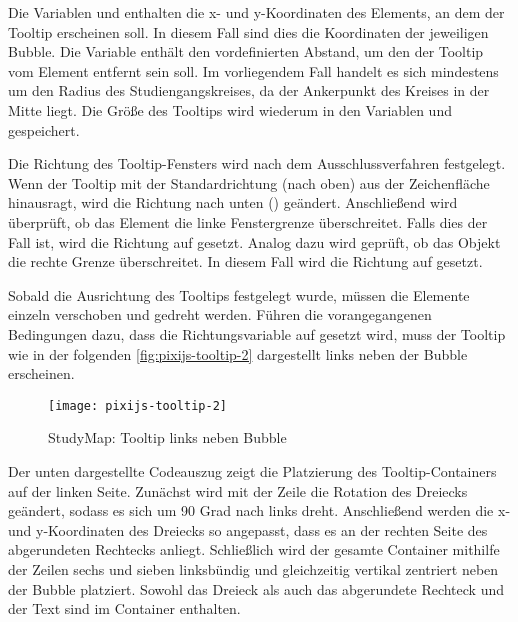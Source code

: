 Die Variablen  und  enthalten die x- und y-Koordinaten des Elements, an dem der Tooltip erscheinen soll. In diesem Fall sind dies die Koordinaten der jeweiligen Bubble. Die Variable  enthält den vordefinierten Abstand, um den der Tooltip vom Element entfernt sein soll. Im vorliegendem Fall handelt es sich mindestens um den Radius des Studiengangskreises, da der Ankerpunkt des Kreises in der Mitte liegt. Die Größe des Tooltips wird wiederum in den Variablen  und  gespeichert.

Die Richtung des Tooltip-Fensters wird nach dem Ausschlussverfahren festgelegt. Wenn der Tooltip mit der Standardrichtung  (nach oben) aus der Zeichenfläche hinausragt, wird die Richtung nach unten () geändert. Anschließend wird überprüft, ob das Element die linke Fenstergrenze überschreitet. Falls dies der Fall ist, wird die Richtung auf  gesetzt. Analog dazu wird geprüft, ob das Objekt die rechte Grenze überschreitet. In diesem Fall wird die Richtung auf  gesetzt.

Sobald die Ausrichtung des Tooltips festgelegt wurde, müssen die Elemente einzeln verschoben und gedreht werden. Führen die vorangegangenen Bedingungen dazu, dass die Richtungsvariable  auf  gesetzt wird, muss der Tooltip wie in der folgenden \autoref{fig:pixijs-tooltip-2} dargestellt links neben der Bubble erscheinen.

\begin{figure}[H]
    \centering
    \texttt{[image: pixijs-tooltip-2]}
    \caption{StudyMap: Tooltip links neben Bubble}
    \label{fig:pixijs-tooltip-2}
\end{figure}

Der unten dargestellte Codeauszug zeigt die Platzierung des Tooltip-Containers auf der linken Seite. Zunächst wird mit der Zeile  die Rotation des Dreiecks geändert, sodass es sich um 90 Grad nach links dreht. Anschließend werden die x- und y-Koordinaten des Dreiecks so angepasst, dass es an der rechten Seite des abgerundeten Rechtecks anliegt. Schließlich wird der gesamte Container mithilfe der Zeilen sechs und sieben linksbündig und gleichzeitig vertikal zentriert neben der Bubble platziert. Sowohl das Dreieck als auch das abgerundete Rechteck und der Text sind im Container enthalten. %

